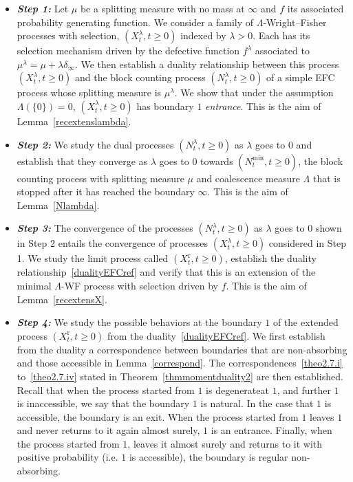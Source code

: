 \documentclass[AHL,Unicode,longabstracts,published]{cedram}
\newcommand{\rmr}{\mathrm{r}}
\begin{document}
\begin{itemize}
\item[-] \textbf{\emph{Step 1:}} Let $\mu$ be a splitting measure with no mass at $\infty$ and $f$ its associated probability generating function. We consider a family of $\Lambda$-Wright--Fisher processes with selection, $(X^{\lambda}_t,t\geq 0)$ indexed by $\lambda>0$. Each has its selection mechanism driven by the defective function $f^{\lambda}$ associated to $\mu^{\lambda}=\mu+\lambda\delta_{\infty}$. We then establish a duality relationship between this process $(X^{\lambda}_t,t\geq 0)$ and the block counting process $(N_t^{\lambda},t\geq 0)$ of a simple EFC process whose splitting measure is $\mu^{\lambda}$. We show that under the assumption $\Lambda(\{0\})=0$, $(X^{\lambda}_t,t\geq 0)$ has boundary $1$ \emph{entrance}. This is the aim of Lemma~\ref{recextenslambda}.
\item[-] \textbf{\emph{Step 2:}} We study the dual processes $(N_t^{\lambda},t\geq 0)$ as $\lambda$ goes to $0$ and establish that they converge as $\lambda$ goes to $0$ towards $(N_t^{\min},t\geq 0)$, the block counting process with splitting measure $\mu$ and coalescence measure $\Lambda$ that is stopped after it has reached the boundary $\infty$. This is the aim of Lemma~\ref{Nlambda}.
\item[-] \textbf{\emph{Step 3:}} The convergence of the processes $(N_t^{\lambda},t\geq 0)$ as $\lambda$ goes to $0$ shown in Step 2 entails the convergence of processes $(X^{\lambda}_t,t\geq 0)$ considered in Step 1. We study the limit process called $(X^{\rmr}_t,t\geq 0)$, establish the duality relationship~\eqref{dualityEFCref} and verify that this is an extension of the minimal $\Lambda$-WF process with selection driven by $f$. This is the aim of Lemma~\ref{recextensX}.
\item[-] \textbf{\emph{Step 4:}} We study the possible behaviors at the boundary $1$ of the extended process $(X_t^{\rmr},t\geq 0)$ from the duality~\eqref{dualityEFCref}. We first establish from the duality a correspondence between boundaries that are non-absorbing and those accessible in Lemma~\ref{correspond}. The correspondences~\eqref{theo2.7.i} to~\eqref{theo2.7.iv} stated in Theorem~\ref{thmmomentduality2} are then established. Recall that when the process started from $1$ is degenerate\linebreak at $1$, and further $1$ is inaccessible, we say that the boundary $1$ is natural. In the case that $1$ is accessible, the boundary is an exit. When the process started from $1$ leaves $1$ and never returns to it again almost surely, $1$ is an entrance. Finally, when the process started from $1$, leaves it almost surely and returns to it with positive probability (i.e. $1$ is accessible), the boundary is regular non-absorbing.
\end{itemize}
\end{document}
